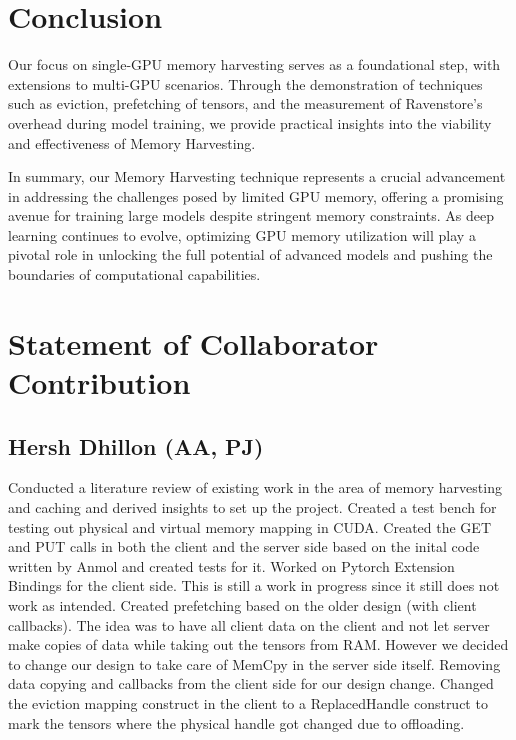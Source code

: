 \documentclass{article}
\begin{document}
\section{Conclusion}
Our focus on single-GPU memory harvesting serves as a foundational step, with extensions to multi-GPU scenarios. Through the demonstration of 
techniques such as eviction, prefetching of tensors, and the measurement of Ravenstore's overhead during model training, we provide practical insights into the viability and effectiveness of Memory Harvesting.

In summary, our Memory Harvesting technique represents a crucial advancement in addressing the challenges posed by limited GPU memory, offering a promising avenue 
for training large models despite stringent memory constraints. As deep learning continues to evolve, optimizing GPU memory utilization will play a pivotal role 
in unlocking the full potential of advanced models and pushing the boundaries of computational capabilities.

\section{Statement of Collaborator Contribution}
\subsection{Hersh Dhillon (AA, PJ)}
Conducted a literature review of existing work in the area of memory harvesting and caching and derived insights to set up the project.
Created a test bench for testing out physical and virtual memory mapping in CUDA.
Created the GET and PUT calls in both the client and the server side based on the inital code written by Anmol and created tests for it.
Worked on Pytorch Extension Bindings for the client side. This is still a work in progress since it still does not work as intended.
Created prefetching based on the older design (with client callbacks). The idea was to have all client data on the client and not let server make copies of data while taking out the tensors from RAM. However we decided to change our design to take care of MemCpy in the server side itself.
Removing data copying and callbacks from the client side for our design change. Changed the eviction mapping construct in the client to a ReplacedHandle construct to mark the tensors where the physical handle got changed due to offloading.
\end{document}
